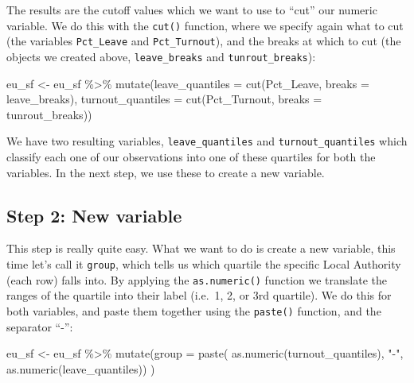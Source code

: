 \documentclass[
  krantz2]{krantz}
\makeatletter
\newenvironment{Shaded}{\begin{snugshade}}{\end{snugshade}}
\newcommand{\AttributeTok}[1]{\textcolor[rgb]{0.61,0.61,0.61}{#1}}
\newcommand{\FunctionTok}[1]{\textcolor[rgb]{0,0,0}{#1}}
\newcommand{\NormalTok}[1]{#1}
\newcommand{\OtherTok}[1]{\textcolor[rgb]{0.37,0.37,0.37}{#1}}
\newcommand{\SpecialCharTok}[1]{\textcolor[rgb]{0,0,0}{#1}}
\newcommand{\StringTok}[1]{\textcolor[rgb]{0.5,0.5,0.5}{#1}}
\newenvironment{kframe}{%
\medskip{}
\setlength{\fboxsep}{.8em}
 \def\at@end@of@kframe{}%
 \ifinner\ifhmode%
  \def\at@end@of@kframe{\end{minipage}}%
  \begin{minipage}{\columnwidth}%
 \fi\fi%
 \def\FrameCommand##1{\hskip\@totalleftmargin \hskip-\fboxsep
 \colorbox{shadecolor}{##1}\hskip-\fboxsep
     \hskip-\linewidth \hskip-\@totalleftmargin \hskip\columnwidth}%
 \MakeFramed {\advance\hsize-\width
   \@totalleftmargin\z@ \linewidth\hsize
   \@setminipage}}%
 {\par\unskip\endMakeFramed%
 \at@end@of@kframe}
\renewenvironment{Shaded}{\begin{kframe}}{\end{kframe}}
\makeatother
\begin{document}
The results are the cutoff values which we want to use to ``cut'' our numeric variable. We do this with the \texttt{cut()} function, where we specify again what to cut (the variables \texttt{Pct\_Leave} and \texttt{Pct\_Turnout}), and the breaks at which to cut (the objects we created above, \texttt{leave\_breaks} and \texttt{tunrout\_breaks}):

\begin{Shaded}
\begin{Highlighting}[]
\NormalTok{eu\_sf }\OtherTok{\textless{}{-}}\NormalTok{ eu\_sf }\SpecialCharTok{\%\textgreater{}\%} 
  \FunctionTok{mutate}\NormalTok{(}\AttributeTok{leave\_quantiles =} \FunctionTok{cut}\NormalTok{(Pct\_Leave, }
                               \AttributeTok{breaks =}\NormalTok{ leave\_breaks), }
         \AttributeTok{turnout\_quantiles =} \FunctionTok{cut}\NormalTok{(Pct\_Turnout, }
                                 \AttributeTok{breaks =}\NormalTok{ tunrout\_breaks))}
\end{Highlighting}
\end{Shaded}

We have two resulting variables, \texttt{leave\_quantiles} and \texttt{turnout\_quantiles} which classify each one of our observations into one of these quartiles for both the variables. In the next step, we use these to create a new variable.

\hypertarget{step-2-new-variable}{%
\subsection{Step 2: New variable}\label{step-2-new-variable}}

This step is really quite easy. What we want to do is create a new variable, this time let's call it \texttt{group}, which tells us which quartile the specific Local Authority (each row) falls into. By applying the \texttt{as.numeric()} function we translate the ranges of the quartile into their label (i.e.~1, 2, or 3rd quartile). We do this for both variables, and paste them together using the \texttt{paste()} function, and the separator ``-'':

\begin{Shaded}
\begin{Highlighting}[]
\NormalTok{eu\_sf }\OtherTok{\textless{}{-}}\NormalTok{ eu\_sf }\SpecialCharTok{\%\textgreater{}\%} 
  \FunctionTok{mutate}\NormalTok{(}\AttributeTok{group =} \FunctionTok{paste}\NormalTok{(}
      \FunctionTok{as.numeric}\NormalTok{(turnout\_quantiles), }\StringTok{"{-}"}\NormalTok{,}
      \FunctionTok{as.numeric}\NormalTok{(leave\_quantiles))}
\NormalTok{    )}
\end{Highlighting}
\end{Shaded}
\end{document}
